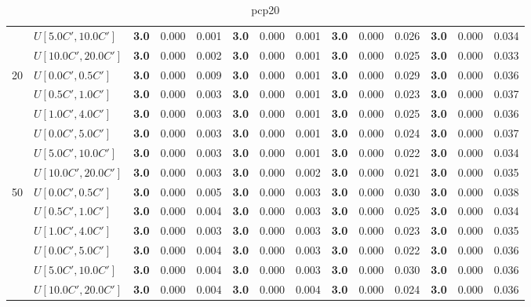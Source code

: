 \begin{table}[h]
{\begin{tabular}{|l|l||l|l|l||l|l|l||l|l|l||l|l|l|}
       & $U[5.0C',10.0C']$ & \textbf{3.0} & 0.000 & 0.001 & \textbf{3.0} & 0.000 & 0.001 & \textbf{3.0} & 0.000 & 0.026 & \textbf{3.0} & 0.000 & 0.034 \\
       & $U[10.0C',20.0C']$ & \textbf{3.0} & 0.000 & 0.002 & \textbf{3.0} & 0.000 & 0.001 & \textbf{3.0} & 0.000 & 0.025 & \textbf{3.0} & 0.000 & 0.033 \\
      \hline\hline
      \multirow{6}{*}{20} & $U[0.0C',0.5C']$ & \textbf{3.0} & 0.000 & 0.009 & \textbf{3.0} & 0.000 & 0.001 & \textbf{3.0} & 0.000 & 0.029 & \textbf{3.0} & 0.000 & 0.036 \\
       & $U[0.5C',1.0C']$ & \textbf{3.0} & 0.000 & 0.003 & \textbf{3.0} & 0.000 & 0.001 & \textbf{3.0} & 0.000 & 0.023 & \textbf{3.0} & 0.000 & 0.037 \\
       & $U[1.0C',4.0C']$ & \textbf{3.0} & 0.000 & 0.003 & \textbf{3.0} & 0.000 & 0.001 & \textbf{3.0} & 0.000 & 0.025 & \textbf{3.0} & 0.000 & 0.036 \\
       & $U[0.0C',5.0C']$ & \textbf{3.0} & 0.000 & 0.003 & \textbf{3.0} & 0.000 & 0.001 & \textbf{3.0} & 0.000 & 0.024 & \textbf{3.0} & 0.000 & 0.037 \\
       & $U[5.0C',10.0C']$ & \textbf{3.0} & 0.000 & 0.003 & \textbf{3.0} & 0.000 & 0.001 & \textbf{3.0} & 0.000 & 0.022 & \textbf{3.0} & 0.000 & 0.034 \\
       & $U[10.0C',20.0C']$ & \textbf{3.0} & 0.000 & 0.003 & \textbf{3.0} & 0.000 & 0.002 & \textbf{3.0} & 0.000 & 0.021 & \textbf{3.0} & 0.000 & 0.035 \\
      \hline\hline
      \multirow{6}{*}{50} & $U[0.0C',0.5C']$ & \textbf{3.0} & 0.000 & 0.005 & \textbf{3.0} & 0.000 & 0.003 & \textbf{3.0} & 0.000 & 0.030 & \textbf{3.0} & 0.000 & 0.038 \\
       & $U[0.5C',1.0C']$ & \textbf{3.0} & 0.000 & 0.004 & \textbf{3.0} & 0.000 & 0.003 & \textbf{3.0} & 0.000 & 0.025 & \textbf{3.0} & 0.000 & 0.034 \\
       & $U[1.0C',4.0C']$ & \textbf{3.0} & 0.000 & 0.003 & \textbf{3.0} & 0.000 & 0.003 & \textbf{3.0} & 0.000 & 0.023 & \textbf{3.0} & 0.000 & 0.035 \\
       & $U[0.0C',5.0C']$ & \textbf{3.0} & 0.000 & 0.004 & \textbf{3.0} & 0.000 & 0.003 & \textbf{3.0} & 0.000 & 0.022 & \textbf{3.0} & 0.000 & 0.036 \\
       & $U[5.0C',10.0C']$ & \textbf{3.0} & 0.000 & 0.004 & \textbf{3.0} & 0.000 & 0.003 & \textbf{3.0} & 0.000 & 0.030 & \textbf{3.0} & 0.000 & 0.036 \\
       & $U[10.0C',20.0C']$ & \textbf{3.0} & 0.000 & 0.004 & \textbf{3.0} & 0.000 & 0.004 & \textbf{3.0} & 0.000 & 0.024 & \textbf{3.0} & 0.000 & 0.036 \\
      \hline
      \end{tabular}
      }
      \caption{pcp20}
      \label{tab:pcp20}\end{table}


